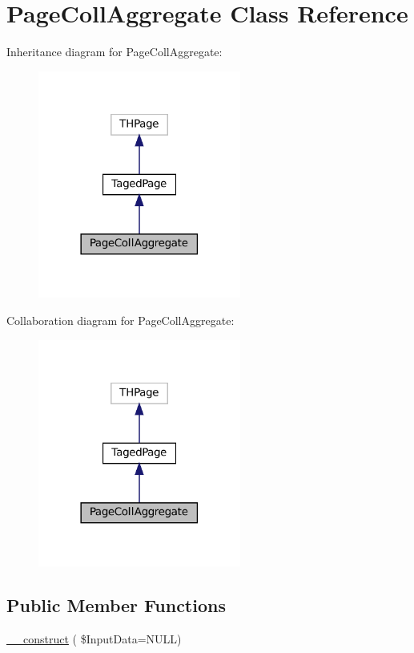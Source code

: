\hypertarget{class_page_coll_aggregate}{}\section{Page\+Coll\+Aggregate Class Reference}
\label{class_page_coll_aggregate}


Inheritance diagram for Page\+Coll\+Aggregate\+:\nopagebreak
\begin{figure}[H]
\begin{center}
\leavevmode
\includegraphics[width=189pt]{class_page_coll_aggregate__inherit__graph}
\end{center}
\end{figure}


Collaboration diagram for Page\+Coll\+Aggregate\+:\nopagebreak
\begin{figure}[H]
\begin{center}
\leavevmode
\includegraphics[width=189pt]{class_page_coll_aggregate__coll__graph}
\end{center}
\end{figure}
\subsection*{Public Member Functions}
\begin{DoxyCompactItemize}
\item 
\hyperlink{class_page_coll_aggregate_aa2925bde9ed69a2a68509baf00b7989c}{\+\_\+\+\_\+construct} ( \$Input\+Data=N\+U\+LL)
\end{DoxyCompactItemize}
